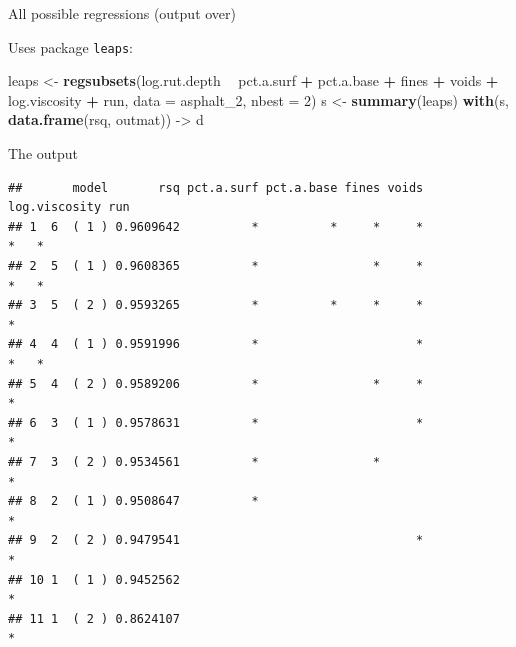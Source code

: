 \documentclass[
  ignorenonframetext,
]{beamer}
\newenvironment{Shaded}{\begin{snugshade}}{\end{snugshade}}
\newcommand{\DataTypeTok}[1]{\textcolor[rgb]{0.13,0.29,0.53}{#1}}
\newcommand{\DecValTok}[1]{\textcolor[rgb]{0.00,0.00,0.81}{#1}}
\newcommand{\KeywordTok}[1]{\textcolor[rgb]{0.13,0.29,0.53}{\textbf{#1}}}
\newcommand{\NormalTok}[1]{#1}
\newcommand{\OperatorTok}[1]{\textcolor[rgb]{0.81,0.36,0.00}{\textbf{#1}}}
\newcommand{\StringTok}[1]{\textcolor[rgb]{0.31,0.60,0.02}{#1}}
\begin{document}
\begin{frame}[fragile]{All possible regressions (output over)}
\protect\hypertarget{all-possible-regressions-output-over}{}

Uses package \texttt{leaps}:

\begin{Shaded}
\begin{Highlighting}[]
\NormalTok{leaps <-}\StringTok{ }\KeywordTok{regsubsets}\NormalTok{(log.rut.depth }\OperatorTok{~}\StringTok{ }\NormalTok{pct.a.surf }\OperatorTok{+}\StringTok{ }\NormalTok{pct.a.base }\OperatorTok{+}\StringTok{ }\NormalTok{fines }\OperatorTok{+}\StringTok{ }\NormalTok{voids }\OperatorTok{+}
\StringTok{  }\NormalTok{log.viscosity }\OperatorTok{+}\StringTok{ }\NormalTok{run, }\DataTypeTok{data =}\NormalTok{ asphalt_}\DecValTok{2}\NormalTok{, }\DataTypeTok{nbest =} \DecValTok{2}\NormalTok{)}
\NormalTok{s <-}\StringTok{ }\KeywordTok{summary}\NormalTok{(leaps)}
\KeywordTok{with}\NormalTok{(s, }\KeywordTok{data.frame}\NormalTok{(rsq, outmat)) ->}\StringTok{ }\NormalTok{d}
\end{Highlighting}
\end{Shaded}

\end{frame}

\begin{frame}[fragile]{The output}
\protect\hypertarget{the-output}{}

\scriptsize

\begin{Shaded}
\end{Shaded}

\begin{verbatim}
##       model       rsq pct.a.surf pct.a.base fines voids log.viscosity run
## 1  6  ( 1 ) 0.9609642          *          *     *     *             *   *
## 2  5  ( 1 ) 0.9608365          *                *     *             *   *
## 3  5  ( 2 ) 0.9593265          *          *     *     *             *    
## 4  4  ( 1 ) 0.9591996          *                      *             *   *
## 5  4  ( 2 ) 0.9589206          *                *     *             *    
## 6  3  ( 1 ) 0.9578631          *                      *             *    
## 7  3  ( 2 ) 0.9534561          *                *                   *    
## 8  2  ( 1 ) 0.9508647          *                                    *    
## 9  2  ( 2 ) 0.9479541                                 *             *    
## 10 1  ( 1 ) 0.9452562                                               *    
## 11 1  ( 2 ) 0.8624107                                                   *
\end{verbatim}

\normalsize

\end{frame}
\end{document}
